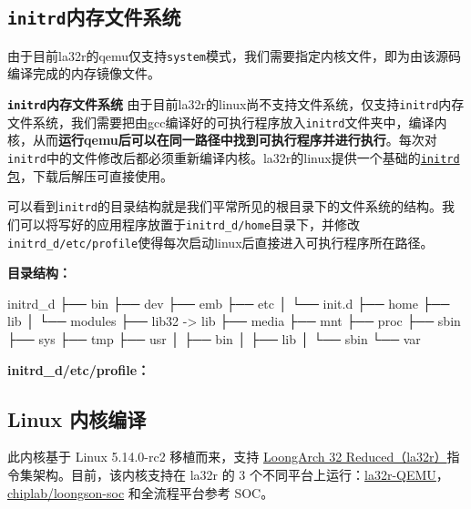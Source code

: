 \subsection{\texorpdfstring{\texttt{initrd}内存文件系统}{initrd内存文件系统}}\label{sec:02-software-preparation-017}

由于目前la32r的qemu仅支持\texttt{system}模式，我们需要指定内核文件，即为由该源码编译完成的内存镜像文件。

\textbf{\texttt{initrd}内存文件系统} 由于目前la32r的linux尚不支持文件系统，仅支持\texttt{initrd}内存文件系统，我们需要把由gcc编译好的可执行程序放入\texttt{initrd}文件夹中，编译内核，从而\textbf{运行qemu后可以在同一路径中找到可执行程序并进行执行}。每次对\texttt{initrd}中的文件修改后都必须重新编译内核。la32r的linux提供一个基础的\href{https://gitee.com/loongson-edu/la32r-Linux/releases}{\texttt{initrd}包}，下载后解压可直接使用。

可以看到\texttt{initrd}的目录结构就是我们平常所见的根目录下的文件系统的结构。我们可以将写好的应用程序放置于\texttt{initrd\_d/home}目录下，并修改\texttt{initrd\_d/etc/profile}使得每次启动linux后直接进入可执行程序所在路径。

\textbf{目录结构：}

\begin{CodeBlock}[language=BookText]
initrd_d
├── bin
├── dev
├── emb
├── etc
│   └── init.d
├── home
├── lib
│   └── modules
├── lib32 -> lib
├── media
├── mnt
├── proc
├── sbin
├── sys
├── tmp
├── usr
│   ├── bin
│   ├── lib
│   └── sbin
└── var
\end{CodeBlock}

\textbf{initrd\_d/etc/profile：}


\subsection{Linux 内核编译}\label{sec:02-software-preparation-018}

此内核基于 Linux 5.14.0-rc2 移植而来，支持 \href{https://www.loongson.cn/uploads/images/2023041918122813624.\%E9\%BE\%99\%E8\%8A\%AF\%E6\%9E\%B6\%E6\%9E\%8432\%E4\%BD\%8D\%E7\%B2\%BE\%E7\%AE\%80\%E7\%89\%88\%E5\%8F\%82\%E8\%80\%83\%E6\%89\%8B\%E5\%86\%8C_r1p03.pdf}{LoongArch 32 Reduced（la32r）}指令集架构。目前，该内核支持在 la32r 的 3 个不同平台上运行：\href{https://gitee.com/loongson-edu/la32r-QEMU}{la32r-QEMU}，\href{https://gitee.com/loongson-edu/chiplab}{chiplab/loongson-soc} 和全流程平台参考 SOC。

